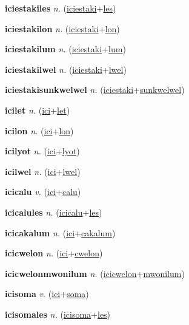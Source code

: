 \textbf{\hypertarget{iciestakiles}{iciestakiles}} \textit{n.} (\hyperlink{iciestaki}{iciestaki}+\allowbreak \hyperlink{les}{les})


\textbf{\hypertarget{iciestakilon}{iciestakilon}} \textit{n.} (\hyperlink{iciestaki}{iciestaki}+\allowbreak \hyperlink{lon}{lon})


\textbf{\hypertarget{iciestakilum}{iciestakilum}} \textit{n.} (\hyperlink{iciestaki}{iciestaki}+\allowbreak \hyperlink{lum}{lum})


\textbf{\hypertarget{iciestakilwel}{iciestakilwel}} \textit{n.} (\hyperlink{iciestaki}{iciestaki}+\allowbreak \hyperlink{lwel}{lwel})


\textbf{\hypertarget{iciestakisunkwelwel}{iciestakisunkwelwel}} \textit{n.} (\hyperlink{iciestaki}{iciestaki}+\allowbreak \hyperlink{sunkwelwel}{sunkwelwel})


\textbf{\hypertarget{icilet}{icilet}} \textit{n.} (\hyperlink{ici}{ici}+\allowbreak \hyperlink{let}{let})


\textbf{\hypertarget{icilon}{icilon}} \textit{n.} (\hyperlink{ici}{ici}+\allowbreak \hyperlink{lon}{lon})


\textbf{\hypertarget{icilyot}{icilyot}} \textit{n.} (\hyperlink{ici}{ici}+\allowbreak \hyperlink{lyot}{lyot})


\textbf{\hypertarget{icilwel}{icilwel}} \textit{n.} (\hyperlink{ici}{ici}+\allowbreak \hyperlink{lwel}{lwel})


\textbf{\hypertarget{icicalu}{icicalu}} \textit{v.} (\hyperlink{ici}{ici}+\allowbreak \hyperlink{calu}{calu})


\textbf{\hypertarget{icicalules}{icicalules}} \textit{n.} (\hyperlink{icicalu}{icicalu}+\allowbreak \hyperlink{les}{les})


\textbf{\hypertarget{icicakalum}{icicakalum}} \textit{n.} (\hyperlink{ici}{ici}+\allowbreak \hyperlink{cakalum}{cakalum})


\textbf{\hypertarget{icicwelon}{icicwelon}} \textit{n.} (\hyperlink{ici}{ici}+\allowbreak \hyperlink{cwelon}{cwelon})


\textbf{\hypertarget{icicwelonmwonilum}{icicwelonmwonilum}} \textit{n.} (\hyperlink{icicwelon}{icicwelon}+\allowbreak \hyperlink{mwonilum}{mwonilum})


\textbf{\hypertarget{icisoma}{icisoma}} \textit{v.} (\hyperlink{ici}{ici}+\allowbreak \hyperlink{soma}{soma})


\textbf{\hypertarget{icisomales}{icisomales}} \textit{n.} (\hyperlink{icisoma}{icisoma}+\allowbreak \hyperlink{les}{les})


